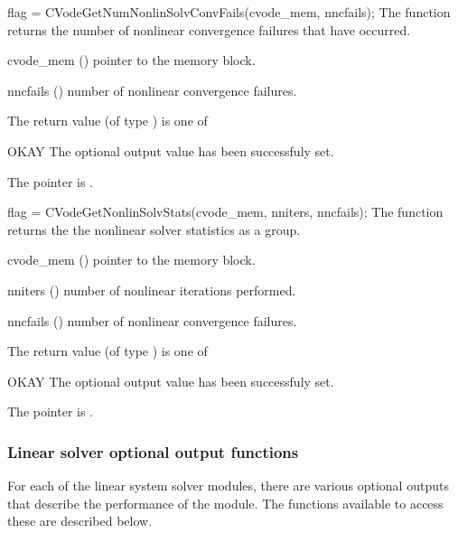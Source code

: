 {}
{
  flag = CVodeGetNumNonlinSolvConvFails(cvode\_mem, nncfails);
}
{
  The function  returns the
  number of nonlinear convergence failures that have occurred.
}
{
  \begin{args}
  \item[cvode\_mem] ()
    pointer to the {\cvode} memory block.
  \item[nncfails] ()
    number of nonlinear convergence failures.
  \end{args}
}
{
  The return value  (of type ) is one of
  \begin{args}
  \item[OKAY] 
    The optional output value has been successfuly set.
  \item[\Id{CVG\_NO\_MEM}]
    The  pointer is .
  \end{args}
}
{}
{
  flag = CVodeGetNonlinSolvStats(cvode\_mem, nniters, nncfails);
}
{
  The function  returns the the
  {\cvode} nonlinear solver statistics as a group.
}
{
  \begin{args}
  \item[cvode\_mem] ()
    pointer to the {\cvode} memory block.
  \item[nniters] ()
    number of nonlinear iterations performed.
  \item[nncfails] ()
    number of nonlinear convergence failures.
  \end{args}
}
{
  The return value  (of type ) is one of
  \begin{args}
  \item[OKAY] 
    The optional output value has been successfuly set.
  \item[\Id{CVG\_NO\_MEM}]
    The  pointer is .
  \end{args}
}
{}

\subsubsection{Linear solver optional output functions}

For each of the linear system solver modules, there are various optional 
outputs that describe the performance of the module. The functions available 
to access these are described below.

